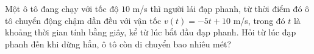 \begin{bt}%

	Một ô tô đang chạy với tốc độ $10$ m/s thì người lái đạp phanh, từ thời điểm đó ô tô chuyển động chậm dần đều với vận tốc $v(t)=-5t+10$ m/s, trong đó $t$ là khoảng thời gian tính bằng giây, kể từ lúc bắt đầu đạp phanh. Hỏi từ lúc đạp phanh đến khi dừng hẳn, ô tô còn di chuyển bao nhiêu mét?
\end{bt}

